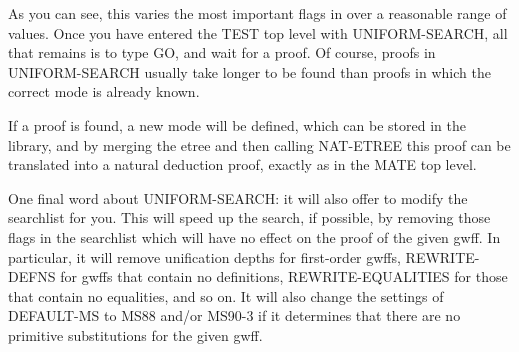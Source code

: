 As you can see, this varies the most important flags in {\TPS} over a reasonable range of values.
Once you have entered the TEST top level with UNIFORM-SEARCH, all that remains is to type GO,
and wait for a proof. Of course, proofs in UNIFORM-SEARCH usually take longer to be found than proofs in which
the correct mode is already known.

If a proof is found, a new mode will be defined, which can be stored in the library, and by merging the etree
and then calling NAT-ETREE this proof can be translated into a natural deduction proof, exactly
as in the MATE top level.

One final word about UNIFORM-SEARCH: it will also offer to modify the searchlist for you.
This will speed up the search, if possible, by removing those flags in the searchlist
which will have no effect on the proof of the given gwff. In particular, it will remove
unification depths for first-order gwffs, REWRITE-DEFNS for gwffs that contain no definitions,
REWRITE-EQUALITIES for those that contain no equalities, and so on. It will also change the
settings of DEFAULT-MS to MS88 and/or MS90-3 if it determines that there are no primitive
substitutions for the given gwff.

